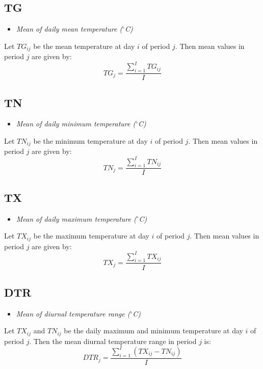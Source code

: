 \documentclass[a4paper,11pt]{article}
\begin{document}
\subsection*{TG}
\begin{itemize}
\item \textit{Mean of daily mean temperature ($^\circ$C)}
\end{itemize}
Let $TG_{ij}$ be the mean temperature at day $i$ of period $j$. Then
mean values in period $j$ are given by:
\begin{equation*}
TG_{j} = \frac{\sum_{i=1}^{I}TG_{ij}}{I}
\end{equation*}

\subsection*{TN}
\begin{itemize}
\item \textit{Mean of daily minimum temperature ($^\circ$C)}
\end{itemize}
Let $TN_{ij}$ be the minimum temperature at day $i$ of period $j$. Then
mean values in period $j$ are given by:
\begin{equation*}
TN_{j} = \frac{\sum_{i=1}^{I}TN_{ij}}{I}
\end{equation*}

\subsection*{TX}
\begin{itemize}
\item \textit{Mean of daily maximum temperature ($^\circ$C)}
\end{itemize}
Let $TX_{ij}$ be the maximum temperature at day $i$ of period $j$. Then
mean values in period $j$ are given by:
\begin{equation*}
TX_{j} = \frac{\sum_{i=1}^{I}TX_{ij}}{I}
\end{equation*}

\subsection*{DTR}
\begin{itemize}
\item \textit{Mean of diurnal temperature range ($^\circ$C)}
\end{itemize}
Let $TX_{ij}$ and $TN_{ij}$ be the daily maximum and minimum
temperature at day $i$ of period $j$. Then the mean diurnal
temperature range in period $j$ is:
\begin{equation*}
DTR_{j} = \frac{\sum_{i=1}^{I}(TX_{ij} - TN_{ij})}{I}
\end{equation*}
\end{document}
